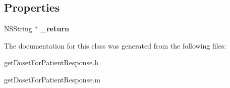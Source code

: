 \subsection*{Properties}
\begin{DoxyCompactItemize}
\item 
\hypertarget{interfaceget_doset_for_patient_response_a296bbdabaf01605aa9223594fb761f63}{}N\+S\+String $\ast$ {\bfseries \+\_\+return}\label{interfaceget_doset_for_patient_response_a296bbdabaf01605aa9223594fb761f63}

\end{DoxyCompactItemize}


The documentation for this class was generated from the following files\+:\begin{DoxyCompactItemize}
\item 
get\+Doset\+For\+Patient\+Response.\+h\item 
get\+Doset\+For\+Patient\+Response.\+m\end{DoxyCompactItemize}
